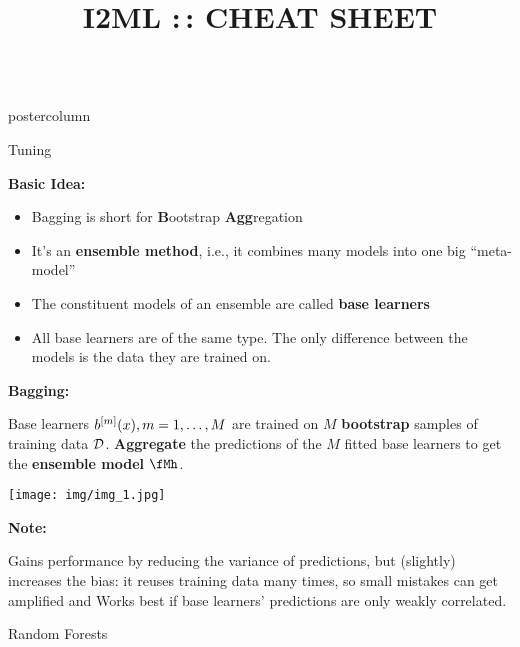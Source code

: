 \documentclass{beamer}
\title{I2ML :\,: CHEAT SHEET} %
\newlength{\columnheight} %
\begin{document}
\begin{frame}[fragile]{}
\begin{columns}
	\begin{column}{.31\textwidth}
		\begin{beamercolorbox}[center]{postercolumn}
			\begin{minipage}{.98\textwidth}
				\parbox[t][\columnheight]{\textwidth}{
					\begin{myblock}{Tuning}
						\begin{codebox}
			\textbf{Basic Idea:}
						\end{codebox}
						\begin{itemize}
                        \item Bagging is short for \textbf{B}ootstrap \textbf{Agg}regation
                        \item It's an \textbf{ensemble method}, i.e., it combines many models into one 
        big \enquote{meta-model}
                        \item The constituent models of an ensemble are called \textbf{base learners}
                        \item All base learners are of the same type. The only difference between the models is the data they are trained on.
                        \end{itemize}
						\hspace*{1ex}
				
						\begin{codebox}
			\textbf{Bagging: }
						\end{codebox}
						Base learners $b^{[m]}(x), m = 1, \dots, M$ are trained on $M$ \textbf{bootstrap} samples of training data $\mathcal{D}$. \textbf{Aggregate} the predictions of the $M$ fitted base learners to get the \textbf{ensemble model} $\fMh$.
						
						\texttt{[image: img/img\_1.jpg]}
						
						\begin{codebox}
			\textbf{Note: }
						\end{codebox}
						Gains performance by reducing the variance of predictions, but (slightly) increases the bias: it reuses training data many times, so small mistakes can get amplified and Works best if base learners' predictions are only weakly correlated.
						\end{myblock}
						
					\begin{myblock}{Random Forests}
					

\end{myblock}}
\end{minipage}
\end{beamercolorbox}
\end{column}
\end{columns}
\end{frame}
\end{document}

